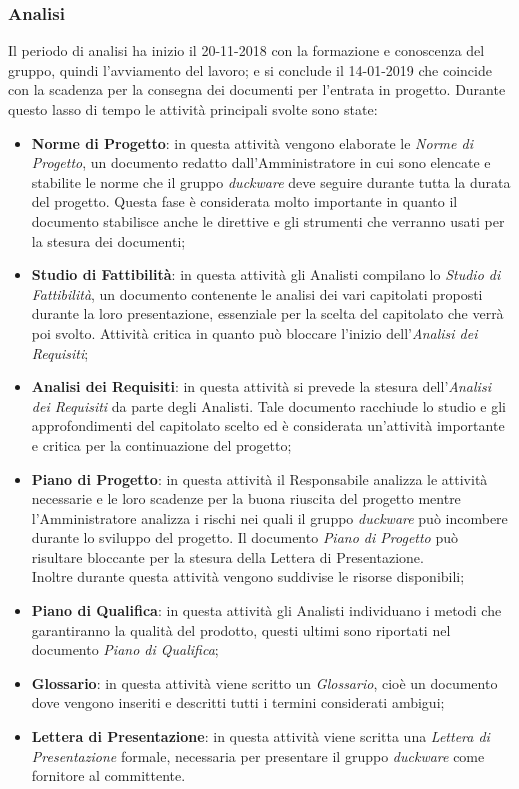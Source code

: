 \subsubsection{Analisi}
Il periodo di analisi ha inizio il 20-11-2018 con la formazione e conoscenza del gruppo, quindi l'avviamento del lavoro; e si conclude il 14-01-2019 che coincide con la scadenza per la consegna dei documenti per l'entrata in progetto. Durante questo lasso di tempo le attività principali svolte sono state:
	\begin{itemize}
		\item \textbf{Norme di Progetto}: in questa attività vengono elaborate le \emph{Norme di Progetto}, un documento redatto dall'Amministratore in cui sono elencate e stabilite le norme che il gruppo \emph{duckware} deve seguire durante tutta la durata del progetto. Questa fase è considerata molto importante in quanto il documento stabilisce anche le direttive e gli strumenti che verranno usati per la stesura dei documenti;
		\item \textbf{Studio di Fattibilità}: in questa attività gli Analisti compilano lo \emph{Studio di Fattibilità}, un documento contenente le analisi dei vari capitolati proposti durante la loro presentazione, essenziale per la scelta del capitolato che verrà poi svolto. Attività critica in quanto può bloccare l'inizio dell'\emph{Analisi dei Requisiti};
		\item \textbf{Analisi dei Requisiti}: in questa attività si prevede la stesura dell'\emph{Analisi dei Requisiti} da parte degli Analisti. Tale documento racchiude lo studio e gli approfondimenti del capitolato scelto ed è considerata un'attività importante e critica per la continuazione del progetto;
		\item \textbf{Piano di Progetto}: in questa attività il Responsabile analizza le attività necessarie e le loro scadenze per la buona riuscita del progetto mentre l'Amministratore analizza i rischi nei quali il gruppo \emph{duckware} può incombere durante lo sviluppo del progetto. Il documento \emph{Piano di Progetto} può risultare bloccante per la stesura della Lettera di Presentazione. \\Inoltre durante questa attività vengono suddivise le risorse disponibili;
		\item \textbf{Piano di Qualifica}: in questa attività gli Analisti individuano i metodi che garantiranno la qualità del prodotto, questi ultimi sono riportati nel documento \emph{Piano di Qualifica};
		\item \textbf{Glossario}: in questa attività viene scritto un \emph{Glossario}, cioè un documento dove vengono inseriti e descritti tutti i termini considerati ambigui;
		\item \textbf{Lettera di Presentazione}: in questa attività viene scritta una \emph{Lettera di Presentazione} formale, necessaria per presentare il gruppo \emph{duckware} come fornitore al committente.
	\end{itemize}
